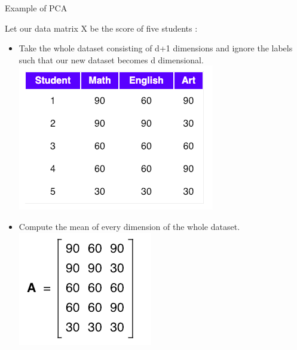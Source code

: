 \documentclass{beamer}
\begin{document}
\begin{frame}{Example of PCA}
	\begin{flushleft}
Let our data matrix X be the score of five students :
	\begin{itemize}
	\item Take the whole dataset consisting of d+1 dimensions and ignore the labels such that our new dataset becomes d dimensional.
	\includegraphics[scale=0.4]{data}\\
	\item Compute the mean of every dimension of the whole dataset.
	\includegraphics[scale=0.4]{matrixA}\\
	\end{itemize}
\end{flushleft}
\end{frame}
\end{document}
